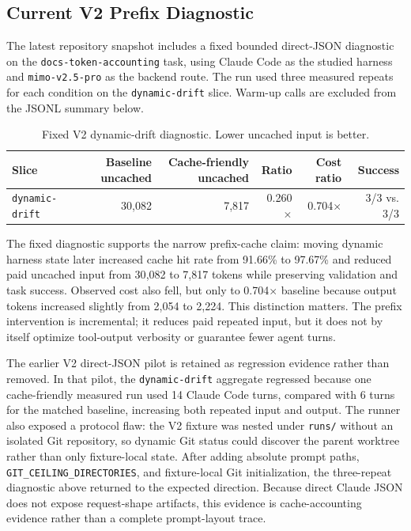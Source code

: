 \subsection{Current V2 Prefix Diagnostic}

The latest repository snapshot includes a fixed bounded direct-JSON diagnostic on the \texttt{docs-token-accounting} task, using Claude Code as the studied harness and \texttt{mimo-v2.5-pro} as the backend route. The run used three measured repeats for each condition on the \texttt{dynamic-drift} slice. Warm-up calls are excluded from the JSONL summary below.

\begin{table}[h]
\centering
\caption{Fixed V2 dynamic-drift diagnostic. Lower uncached input is better.}
\label{tab:v2-pilot}
\small
\begin{tabularx}{\linewidth}{@{}lrrrrr@{}}
\toprule
\textbf{Slice} & \textbf{Baseline uncached} & \textbf{Cache-friendly uncached} & \textbf{Ratio} & \textbf{Cost ratio} & \textbf{Success} \\
\midrule
\texttt{dynamic-drift} & 30{,}082 & 7{,}817 & 0.260$\times$ & 0.704$\times$ & 3/3 vs. 3/3 \\
\bottomrule
\end{tabularx}
\end{table}

The fixed diagnostic supports the narrow prefix-cache claim: moving dynamic harness state later increased cache hit rate from 91.66\% to 97.67\% and reduced paid uncached input from 30{,}082 to 7{,}817 tokens while preserving validation and task success. Observed cost also fell, but only to 0.704$\times$ baseline because output tokens increased slightly from 2{,}054 to 2{,}224. This distinction matters. The prefix intervention is incremental; it reduces paid repeated input, but it does not by itself optimize tool-output verbosity or guarantee fewer agent turns.

The earlier V2 direct-JSON pilot is retained as regression evidence rather than removed. In that pilot, the \texttt{dynamic-drift} aggregate regressed because one cache-friendly measured run used 14 Claude Code turns, compared with 6 turns for the matched baseline, increasing both repeated input and output. The runner also exposed a protocol flaw: the V2 fixture was nested under \texttt{runs/} without an isolated Git repository, so dynamic Git status could discover the parent worktree rather than only fixture-local state. After adding absolute prompt paths, \texttt{GIT\_CEILING\_DIRECTORIES}, and fixture-local Git initialization, the three-repeat diagnostic above returned to the expected direction. Because direct Claude JSON does not expose request-shape artifacts, this evidence is cache-accounting evidence rather than a complete prompt-layout trace.

